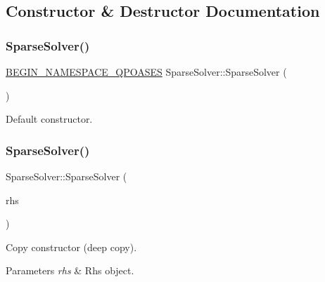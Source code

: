 \subsection{Constructor \& Destructor Documentation}
\mbox{\label{class_sparse_solver_a2110cd4c01cd32d500d0669f400aa62e}} 
\subsubsection{\texorpdfstring{Sparse\+Solver()}{SparseSolver()}\hspace{0.1cm}{\footnotesize\ttfamily [1/2]}}
{\footnotesize\ttfamily \hyperlink{_types_8hpp_afd127fcb3c8f47975e9fa0ec2bacde52}{B\+E\+G\+I\+N\+\_\+\+N\+A\+M\+E\+S\+P\+A\+C\+E\+\_\+\+Q\+P\+O\+A\+S\+ES} Sparse\+Solver\+::\+Sparse\+Solver (\begin{DoxyParamCaption}{ }\end{DoxyParamCaption})}

Default constructor. \mbox{\label{class_sparse_solver_a4e3fe2c55996dac04f32799ab1c9dfe4}} 
\subsubsection{\texorpdfstring{Sparse\+Solver()}{SparseSolver()}\hspace{0.1cm}{\footnotesize\ttfamily [2/2]}}
{\footnotesize\ttfamily Sparse\+Solver\+::\+Sparse\+Solver (\begin{DoxyParamCaption}\item[{const \hyperlink{class_sparse_solver}{Sparse\+Solver} \&}]{rhs }\end{DoxyParamCaption})}

Copy constructor (deep copy). 
\begin{DoxyParams}{Parameters}
{\em rhs} & Rhs object. \\
\hline
\end{DoxyParams}
\mbox{\label{class_sparse_solver_a3caecef282cba18aa863de94135f9617}} 
